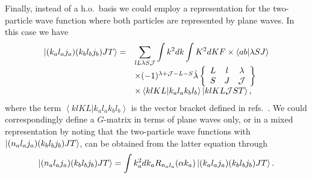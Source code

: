 Finally, instead of a h.o.\ basis we could employ a
representation for the two-particle wave function where both particles
are represented by plane waves. In this case we have
\cite{bon89,kkr79,wc72}
\begin{equation}
\begin{array}{ll}
\left| (k_{a}l_{a}j_{a})(k_{b}l_{b}j_{b})JT \right\rangle=&
{\displaystyle \sum_{lL\lambda S{\cal J}}\int k^{2}dk\int K^{2}dK}
F\times\langle ab|\lambda SJ \rangle
\\
&\times (-1)^{\lambda +{\cal J}-L-S}
\hat{\lambda}
\left\{\begin{array}{ccc}L&l&\lambda\\S&J&{\cal J}
\end{array}\right\}
\\
&\times \left\langle klKL| k_{a}l_{a}k_{b}l_{b}\right\rangle
\left| klKL{\cal J}ST \right\rangle,\end{array}\label{eq:kk}
\end{equation}
where the term $\left\langle klKL| k_{a}l_{a}k_{b}l_{b}\right\rangle$
is the vector bracket defined in refs.\ \cite{kkr79,wc72}. We could
correspondingly define a $G$-matrix in terms of plane waves only, or 
in a mixed representation by noting that
the two-particle wave functions with
$\left| (n_{a}l_{a}j_{a})(k_{b}l_{b}j_{b})JT \right\rangle$,
can be obtained from the latter equation through
\begin{equation}
\left| (n_{a}l_{a}j_{a})(k_{b}l_{b}j_{b})JT \right\rangle=
\int k_{a}^{2}dk_{a}R_{n_{a}l_{a}}(\alpha k_{a})
\left| (k_{a}l_{a}j_{a})(k_{b}l_{b}j_{b})JT \right\rangle.    \label{eq:kho}
\end{equation}

